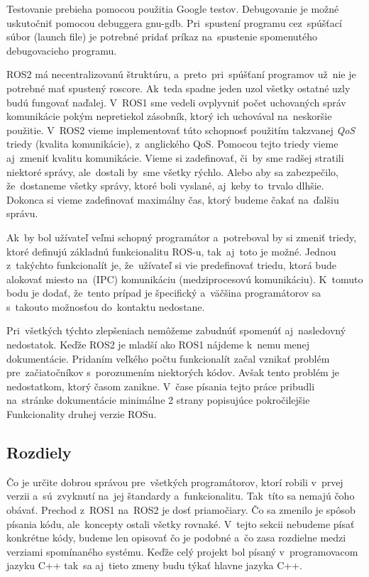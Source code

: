 Testovanie prebieha pomocou použitia Google testov. Debugovanie je možné uskutočniť pomocou debuggera gnu-gdb. Pri~spustení programu
cez~spúšťací súbor (launch file) je potrebné pridať príkaz na~spustenie spomenutého debugovacieho programu.

ROS2 má necentralizovanú štruktúru, a~preto~pri~spúšťaní programov už~nie je potrebné mať spustený roscore. Ak~teda spadne jeden uzol všetky
ostatné uzly budú fungovať naďalej. V~ROS1 sme vedeli ovplyvniť počet uchovaných správ komunikácie pokým nepretiekol zásobník, ktorý ich uchovával
na~neskoršie použitie. V~ROS2 vieme implementovať túto schopnosť použitím takzvanej \textit{QoS} triedy (kvalita komunikácie), z~anglického \acrlong{QoS}.
Pomocou tejto triedy vieme aj~zmeniť kvalitu komunikácie. Vieme si zadefinovať, či~by sme radšej stratili niektoré správy, ale~dostali by~sme
všetky rýchlo. Alebo aby sa zabezpečilo, že~dostaneme všetky správy, ktoré boli vyslané, aj~keby to~trvalo dlhšie. Dokonca si vieme zadefinovať
maximálny čas, ktorý budeme čakať na~ďalšiu správu.

Ak~by bol užívateľ veľmi schopný programátor a~potreboval by si zmeniť triedy, ktoré definujú základnú funkcionalitu ROS-u, tak~aj~toto je možné.
Jednou z~takýchto funkcionalít je, že~užívateľ si vie predefinovať triedu, ktorá bude alokovať miesto na~(IPC) komunikáciu (medziprocesovú komunikáciu).
K~tomuto bodu je dodať, že~tento prípad je špecifický a~väčšina programátorov sa s~takouto možnosťou do~kontaktu nedostane.

Pri~všetkých týchto zlepšeniach nemôžeme zabudnúť spomenúť aj~nasledovný nedostatok. Keďže ROS2 je mladší ako ROS1 nájdeme k~nemu menej dokumentácie.
Pridaním veľkého počtu funkcionalít začal vznikať problém pre~začiatočníkov s~porozumením niektorých kódov. Avšak tento problém je nedostatkom,
ktorý časom zanikne. V~čase písania tejto práce pribudli na~stránke dokumentácie minimálne 2 strany popisujúce pokročilejšie Funkcionality druhej
verzie ROSu.

\subsection{Rozdiely}

Čo je určite dobrou správou pre~všetkých programátorov, ktorí robili v~prvej verzii a~sú~zvyknutí na~jej štandardy a~funkcionalitu. Tak~títo
sa nemajú čoho obávať. Prechod z~ROS1 na~ROS2 je dosť priamočiary. Čo sa zmenilo je spôsob písania kódu, ale~koncepty ostali všetky rovnaké.
V~tejto sekcii nebudeme písať konkrétne kódy, budeme len opisovať čo je podobné a~čo zasa rozdielne medzi verziami spomínaného systému. Keďže
celý projekt bol písaný v~programovacom jazyku C++ tak~sa aj~tieto zmeny budu týkať hlavne jazyka C++.

